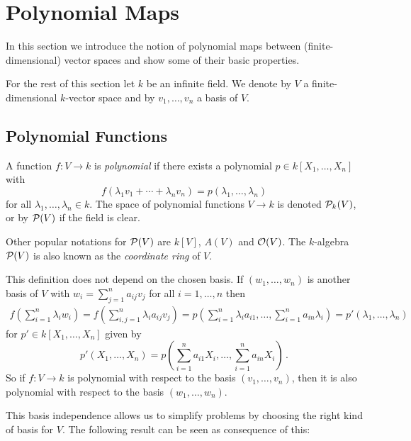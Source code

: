 \section{Polynomial Maps}


\begin{fluff}
  In this section we introduce the notion of polynomial maps between (finite-dimensional) vector spaces and show some of their basic properties.
\end{fluff}


\begin{conventions}
  For the rest of this section let $k$ be an infinite field.
  We denote by $V$ a finite-dimensional $k$-vector space and by $v_1, \dotsc, v_n$ a basis of $V$.
\end{conventions}





\subsection{Polynomial Functions}


\begin{definition}
  A function $f \colon V \to k$ is \emph{polynomial} if there exists a polynomial $p \in k[X_1, \dotsc, X_n]$ with
  \[
      f\left( \lambda_1 v_1 + \dotsb + \lambda_n v_n \right)
    = p(\lambda_1, \dotsc, \lambda_n)
  \]
  for all $\lambda_1, \dotsc, \lambda_n \in k$.
  The space of polynomial functions $V \to k$ is denoted $\mathcal{P}_k(V)$, or by $\mathcal{P}(V)$ if the field is clear.
\end{definition}


\begin{remark}
  Other popular notations for $\mathcal{P}(V)$ are $k[V]$, $A(V)$ and $\mathcal{O}(V)$.
  The $k$-algebra $\mathcal{P}(V)$ is also known as the \emph{coordinate ring} of $V$.
\end{remark}


\begin{fluff}
  This definition does not depend on the chosen basis.
  If $(w_1, \dotsc, w_n)$ is another basis of $V$ with $w_i = \sum_{j=1}^n a_{ij} v_j$ for all $i = 1, \dotsc, n$ then
  \begin{align*}
      f\left( \sum_{i=1}^n \lambda_i w_i \right)
    = f\left( \sum_{i,j=1}^n \lambda_i a_{ij} v_j \right)
    = p
      \left(
        \sum_{i=1}^n \lambda_i a_{i1},
        \dotsc,
        \sum_{i=1}^n a_{in} \lambda_i
      \right)
    =  p'(\lambda_1, \dotsc, \lambda_n)
  \end{align*}
  for $p' \in k[X_1, \dotsc, X_n]$ given by
  \[
      p'(X_1, \dotsc, X_n)
    = p
      \left(
        \sum_{i=1}^n a_{i1} X_i,
        \dotsc,
        \sum_{i=1}^n a_{in} X_i
      \right) \,.
  \]
  So if $f \colon V \to k$ is polynomial with respect to the basis $(v_1, \dotsc, v_n)$, then it is also polynomial with respect to the basis $(w_1, \dotsc, w_n)$.
  
  This basis independence allows us to simplify problems by choosing the right kind of basis for $V$.
  The following result can be seen as consequence of this:
\end{fluff}


